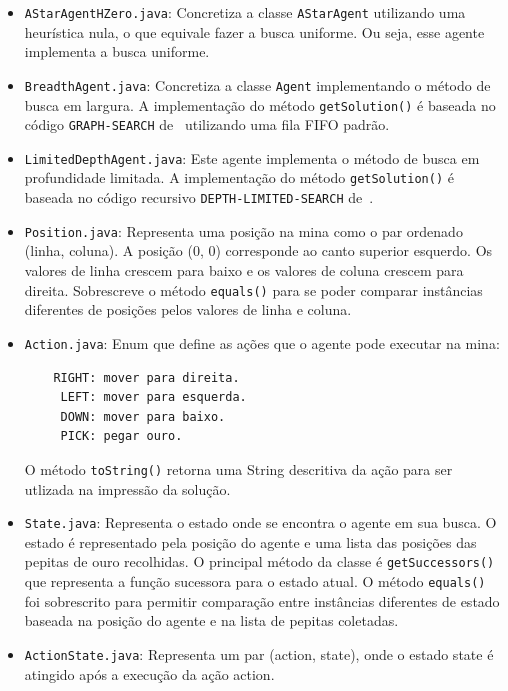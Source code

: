 \documentclass[12pt,a4paper]{article}
\begin{document}
\begin{itemize}
  \item{\verb|AStarAgentHZero.java|}: Concretiza a classe \verb|AStarAgent| utilizando uma 
  heurística nula, o que equivale fazer a busca uniforme. Ou seja, esse agente implementa a busca 
  uniforme. 

  \item{\verb|BreadthAgent.java|}: Concretiza a classe \verb|Agent| implementando o método de busca 
  em largura. A implementação do método \verb|getSolution()| é baseada no código \verb|GRAPH-SEARCH|
  de~\cite{aima} utilizando uma fila FIFO padrão.

  \item{\verb|LimitedDepthAgent.java|}: Este agente implementa o método de busca em profundidade 
  limitada. A implementação do método \verb|getSolution()| é baseada no código recursivo
  \verb|DEPTH-LIMITED-SEARCH| de~\cite{aima}.
  
  \item{\verb|Position.java|}: Representa uma posição na mina como o par ordenado (linha, coluna).
  A posição (0, 0) corresponde ao canto superior esquerdo. Os valores de linha crescem para baixo e 
  os valores de coluna crescem para direita. Sobrescreve o método \verb|equals()| para se poder
  comparar instâncias diferentes de posições pelos valores de linha e coluna.

  \item{\verb|Action.java|}: Enum que define as ações que o agente pode executar na mina:
  \begin{verbatim}
    RIGHT: mover para direita.
     LEFT: mover para esquerda.
     DOWN: mover para baixo.
     PICK: pegar ouro.
  \end{verbatim}
  O método \verb|toString()| retorna uma String descritiva da ação para ser utlizada na impressão da 
  solução.
  
  \item{\verb|State.java|}: Representa o estado onde se encontra o agente em sua busca. O estado é 
  representado pela posição do agente e uma lista das posições das pepitas de ouro recolhidas.
  O principal método da classe é \verb|getSuccessors()| que representa a função sucessora para o 
  estado atual. O método \verb|equals()| foi sobrescrito para permitir comparação entre instâncias
  diferentes de estado baseada na posição do agente e na lista de pepitas coletadas.
  
  \item{\verb|ActionState.java|}: Representa um par (action, state), onde o estado state é atingido 
  após a execução da ação action.


\end{itemize}
\end{document}

